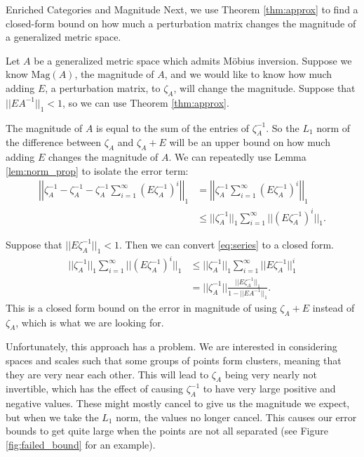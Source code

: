 \documentclass[12pt]{pom_thesis}
\newcommand{\magn}{\text{Mag}}
\begin{document}
\begin{chapter}{Enriched Categories and Magnitude}
Next, we use Theorem \ref{thm:approx} to find a closed-form bound on how much a perturbation matrix changes the magnitude of a generalized metric space.

Let $A$ be a generalized metric space which admits M\"obius inversion. Suppose we know $\magn(A)$, the magnitude of $A$, and we would like to know how much adding $E$, a perturbation matrix, to $\zeta_A$, will change the magnitude. Suppose that $||EA^{-1}||_1 < 1$, so we can use Theorem \ref{thm:approx}.

The magnitude of $A$ is equal to the sum of the entries of $\zeta_A^{-1}$. So the $L_1$ norm of the difference between $\zeta_A$ and $\zeta_A + E$ will be an upper bound on how much adding $E$ changes the magnitude of $A$. We can repeatedly use Lemma \ref{lem:norm_prop} to isolate the error term:
\begin{align}
\left|\left|\zeta_A^{-1} - \zeta_A^{-1} - \zeta_A^{-1}\sum_{i = 1}^\infty (E\zeta_A^{-1})^i\right|\right|_1 \nonumber 
&= \left|\left|\zeta_A^{-1}\sum_{i = 1}^\infty (E\zeta_A^{-1})^i\right|\right|_1 \nonumber \\
&\leq ||\zeta_A^{-1}||_1\sum_{i = 1}^\infty ||(E\zeta_A^{-1})^i||_1. \label{eq:series}
\end{align}

Suppose that $||E\zeta_A^{-1}||_1 <1$. Then we can convert \eqref{eq:series} to a closed form. 
\begin{align*}
||\zeta_A^{-1}||_1\sum_{i = 1}^\infty ||(E\zeta_A^{-1})^i||_1 &\leq
||\zeta_A^{-1}||_1 \sum_{i = 1}^\infty||E\zeta_A^{-1}||_1^i\\
 &= ||\zeta_A^{-1}||\frac{||E\zeta_A^{-1}||_1}{1-||EA^{-1}||_1}.
\end{align*}
This is a closed form bound on the error in magnitude of using $\zeta_A + E$ instead of $\zeta_A$, which is what we are looking for.

Unfortunately, this approach has a problem. We are interested in considering spaces and scales such that some groups of points form clusters, meaning that they are very near each other. This will lead to $\zeta_A$ being very nearly not invertible, which has the effect of causing $\zeta_A^{-1}$ to have very large positive and negative values. These might mostly cancel to give us the magnitude we expect, but when we take the $L_1$ norm, the values no longer cancel. This causes our error bounds to get quite large when the points are not all separated (see Figure \ref{fig:failed_bound} for an example).


\end{chapter}
\end{document}
